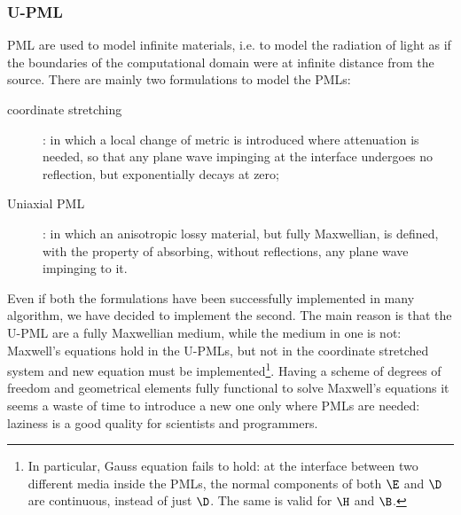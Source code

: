 \subsubsection{U-PML} \label{sec:pml}

PML are used to model infinite materials, i.e. to model the radiation
of light as if the boundaries of the computational domain were at
infinite distance from the source. There are mainly two formulations
to model the PMLs:
\begin{description}
\item[coordinate stretching]: in which a local change of metric is
  introduced where attenuation is needed, so that any plane wave
  impinging at the interface undergoes no reflection, but
  exponentially decays at zero;
\item[Uniaxial PML]: in which an anisotropic lossy material, but fully
  Maxwellian, is defined, with the property of absorbing, without
  reflections, any plane wave impinging to it.
\end{description}

Even if both the formulations have been successfully implemented in
many algorithm, we have decided to implement the second. The main
reason is that the U-PML are a fully Maxwellian medium, while the
medium in one is not: Maxwell's equations hold in the U-PMLs, but not
in the coordinate stretched system and new equation must be
implemented\footnote{In particular, Gauss equation fails to
  hold: at the interface between two different media inside the PMLs,
  the normal components of both $\E$ and $\D$ are continuous, instead
  of just $\D$. The same is valid for $\H$ and $\B$.}. Having a scheme
of degrees of freedom and geometrical elements fully functional to
solve Maxwell's equations it seems a waste of time to introduce a new
one only where PMLs are needed: laziness is a good quality for
scientists and programmers.

